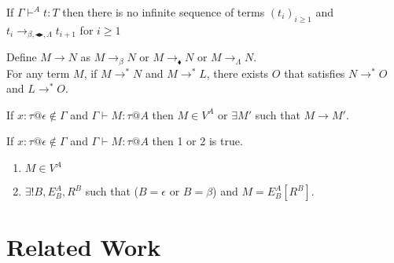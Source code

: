 \documentclass[runningheads]{llncs}
\newcommand{\G}{\Gamma}
\newcommand{\V}{\vdash}
\newcommand{\TB}{\blacktriangleright}
\newcommand{\TBL}{\blacktriangleleft}
\begin{document}
\begin{theorem}
    If $\G\V^A t:T$ then there is no infinite sequence of terms $(t_i)_{i\ge1}$ and $t_i \longrightarrow_{\beta, \TBL \TB,\Lambda} t_{i+1}$ for $i\ge 1$
\end{theorem}

\begin{theorem}
    Define $M \longrightarrow N$ as $M \longrightarrow_{\beta} N$ or $M\longrightarrow_\blacklozenge N$ or  $M \longrightarrow_{\Lambda} N$.\\
    For any term $M$, if $M \longrightarrow^* N$ and $M \longrightarrow^* L$,
    there exists $O$ that satisfies $N \longrightarrow^* O$ and $L \longrightarrow^* O$.
\end{theorem}

\begin{theorem}[Progress]
    If $x:\tau @\epsilon \notin \G$ and $\G \V M : \tau  @ A$ then $ M \in V^A $ or $\exists M'$ such that $M \longrightarrow M'$.
\end{theorem}

\begin{theorem}
    If $x:\tau@\epsilon \notin \G$ and $\G \V M : \tau @ A$ then 1 or 2 is true.
    \begin{enumerate}
        \item $ M \in V^A$
        \item $\exists ! B, E^A_B, R^B$ such that ($B = \epsilon$ or $B = \beta$) and $M = E^A_B[R^B]$.
    \end{enumerate}
\end{theorem}

\section{Related Work}
\end{document}

